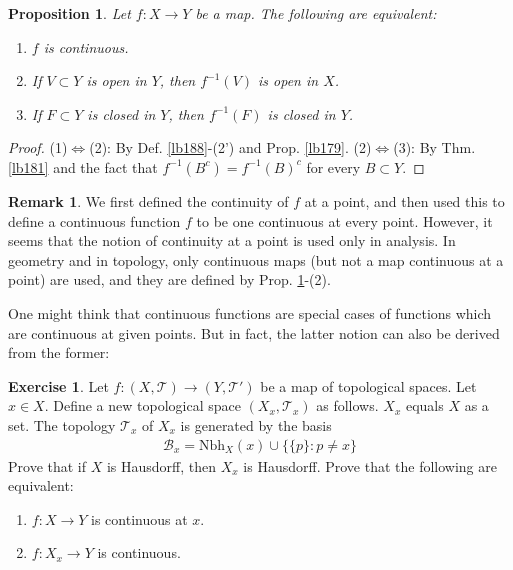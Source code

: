 \documentclass[12pt,b5paper,notitlepage]{article}
\theoremstyle{definition}
\newtheorem{exe}[df]{Exercise}
\newtheorem{rem}[df]{Remark}
\theoremstyle{plain}
\newtheorem{pp}[df]{Proposition}
\newcommand{\mc}{\mathcal}
\newcommand{\Nbh}{\mathrm{Nbh}}
\numberwithin{equation}{section}
\begin{document}
\begin{pp}\label{lb191}
Let $f:X\rightarrow Y$ be a map. The following are equivalent:
\begin{enumerate}[label=(\arabic*)]
\item $f$ is continuous.
\item If $V\subset Y$ is open in $Y$, then $f^{-1}(V)$ is open in $X$.
\item If $F\subset Y$ is closed in $Y$, then $f^{-1}(F)$ is closed in $Y$.
\end{enumerate}
\end{pp}

\begin{proof}
(1)$\Leftrightarrow$(2): By Def. \ref{lb188}-(2') and Prop. \ref{lb179}. (2)$\Leftrightarrow$(3): By Thm. \ref{lb181} and the fact that $f^{-1}(B^c)=f^{-1}(B)^c$ for every $B\subset Y$.
\end{proof}



\begin{rem}
We first defined the continuity of $f$ at a point, and then used this to define a continuous function $f$ to be one continuous at every point. However, it seems that the notion of continuity at a point is used only in analysis. In geometry and in topology, only continuous maps (but not a map continuous at a point) are used, and they are defined by Prop. \ref{lb191}-(2).

One might think that continuous functions are special cases of functions  which are continuous at given points. But in fact, the latter notion can also be derived from the former: \hfill\qedsymbol
\end{rem}

\begin{exe}\label{lb308}
Let $f:(X,\mc T)\rightarrow (Y,\mc T')$ be a map of topological spaces. Let $x\in X$. Define a new topological space $(X_x,\mc T_x)$ as follows. $X_x$ equals $X$ as a set. The topology $\mc T_x$ of $X_x$ is generated by the basis
\begin{align}
\mc B_x=\Nbh_X(x)\cup\big\{\{p\}:p\neq x\big\}
\end{align}
Prove that if $X$ is Hausdorff, then $X_x$ is Hausdorff. Prove that the following are equivalent:
\begin{enumerate}[label=(\arabic*)]
\item $f:X\rightarrow Y$ is continuous at $x$.
\item $f:X_x\rightarrow Y$ is continuous.
\end{enumerate}
\end{exe}
\end{document}
